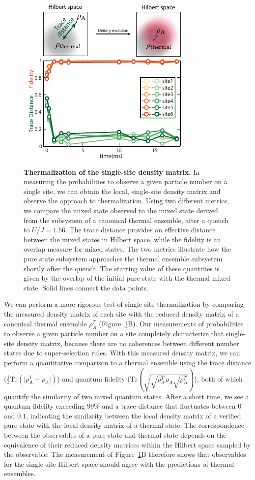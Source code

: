 \begin{figure}[t]
	\centering
	\includegraphics[scale=1.5]{figures/ETH_fidelity.pdf}
	\caption{{\bf Thermalization of the single-site density matrix.} In measuring the probabilities to observe a given particle number on a single site, we can obtain the local, single-site density matrix and observe the approach to thermalization. Using two different metrics, we compare the mixed state observed to the mixed state derived from the subsystem of a canonical thermal ensemble, after a quench to $U/J=1.56$. The trace distance provides an effective distance between the mixed states in Hilbert space, while the fidelity is an overlap measure for mixed states. The two metrics illustrate how the pure state subsystem approaches the thermal ensemble subsystem shortly after the quench. The starting value of these quantities is given by the overlap of the initial pure state with the thermal mixed state. Solid lines connect the data points.}
	\label{fig:ETH_Rho}
\end{figure} 

We can perform a more rigorous test of single-site thermalization by comparing the measured density matrix of each site with the reduced density matrix of a canonical thermal ensemble $\rho_A^T$ (Figure~\ref{fig:ETH_Rho}B). Our measurements of probabilities to observe a given particle number on a site completely characterize that single-site density matrix, because there are no coherences between different number states due to super-selection rules. With this measured density matrix, we can perform a quantitative comparison to a thermal ensemble using the trace distance ($\frac{1}{2}\mathrm{Tr}(\vert \rho_A^T -  \rho_A \vert)$) and quantum fidelity ($\mathrm{Tr}\left ( \sqrt{\sqrt{\rho_A^T} \rho_A \sqrt{\rho_A^T}}\right )$), both of which quantify the similarity of two mixed quantum states. After a short time, we see a quantum fidelity exceeding $99\%$ and a trace-distance that fluctuates between $0$ and $0.1$, indicating the similarity between the local density matrix of a verified pure state with the local density matrix of a thermal state. The correspondence between the observables of a pure state and thermal state depends on the equivalence of their reduced density matrices within the Hilbert space sampled by the observable. The measurement of Figure~\ref{fig:ETH_Rho}B therefore shows that observables for the single-site Hilbert space should agree with the predictions of thermal ensembles. 

